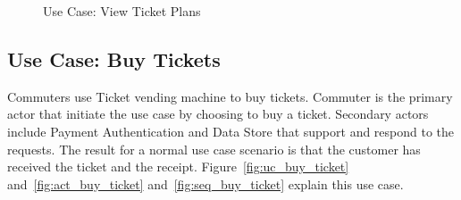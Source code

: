 \documentclass[a4paper,12pt]{report}
\begin{document}
\begin{figure}[!htb]
	\caption{\label{fig:uc_view_ticket_plans}Use Case: View Ticket Plans}	
\end{figure}





\FloatBarrier
\subsection{Use Case: Buy Tickets}
Commuters use Ticket vending machine to buy tickets. Commuter is the primary actor that initiate the use case by choosing to buy a ticket. Secondary actors include Payment Authentication and Data Store that support and respond to the requests. The result for a normal use case scenario is that the customer has received the ticket and the receipt. Figure~\ref{fig:uc_buy_ticket} and~\ref{fig:act_buy_ticket} and~\ref{fig:seq_buy_ticket} explain this use case. \\ 
\end{document}
